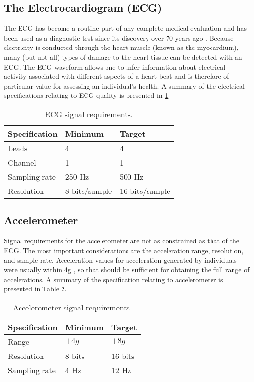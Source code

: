 \subsection{The Electrocardiogram (ECG)}
The ECG has become a routine part of any complete medical evaluation and has been used as a diagnostic 
test since its discovery over 70 years ago \cite{ecg}. Because electricity is conducted through 
the heart muscle (known as the myocardium), many (but not all) types of damage 
to the heart tissue can be detected with an ECG. The ECG waveform allows one to 
infer information about electrical activity associated with different aspects of a heart 
beat and is therefore of particular value for assessing an individual's health. A summary of the electrical specifications relating to ECG quality is presented in \ref{table:ecg}.

\begin{table}
  \centering
  \begin{tabular}{|l|l|l|}
    \hline
    Specification & Minimum & Target \\
    \hline
    Leads & 4 & 4 \\
    Channel & 1 & 1 \\
    Sampling rate & 250 Hz & 500 Hz \\
    Resolution & 8 bits/sample & 16 bits/sample \\
    \hline
  \end{tabular}
  \caption{ECG signal requirements.}
  \label{table:ecg}
\end{table}

\subsection{Accelerometer}
Signal requirements for the accelerometer are not as constrained as that of the ECG. The most important considerations are the acceleration range, resolution, and sample rate. Acceleration values for acceleration generated by individuals were usually within 4g \cite{wearable_ecg}, so that should be sufficient for obtaining the full range of accelerations. A summary of the specification relating to accelerometer is presented in Table \ref{table:acc}.
\begin{table}[h]
	\centering
	\begin{tabular}{|l |l|l|}
		\hline
		Specification & Minimum & Target \\
		\hline
		Range & $\pm 4g$ & $\pm 8g$ \\
		Resolution & 8 bits & 16 bits\\
		Sampling rate & 4 Hz & 12 Hz \\
		\hline
	\end{tabular}
	\caption{Accelerometer signal requirements.}
	\label{table:acc}
\end{table}

